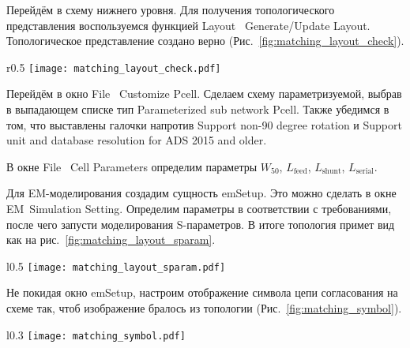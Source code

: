 Перейдём в схему нижнего уровня. Для получения топологического представления воспользуемся функцией Layout \textrightarrow\ Generate/Update Layout.
Топологическое представление создано верно (Рис.~\ref{fig:matching_layout_check}).

\begin{wrapfigure}{r}{0.5\textwidth}
    \centering
    \texttt{[image: matching\_layout\_check.pdf]}
    \caption{Проверка топологического представления}%
    \label{fig:matching_layout_check}
\end{wrapfigure}

Перейдём в окно File \textrightarrow\ Customize Pcell.
Сделаем схему параметризуемой, выбрав в выпадающем списке тип Parameterized sub network Pcell.
Также убедимся в том, что выставлены галочки напротив Support non-90 degree rotation и Support unit and database resolution for ADS 2015 and older.

В окне File \textrightarrow\ Cell Parameters определим параметры $W_{50}$, $L_\text{feed}$, $L_\text{shunt}$, $L_\text{serial}$.

Для EM-моделирования создадим сущность emSetup.
Это можно сделать в окне EM\textrightarrow\ Simulation Setting.
Определим параметры в соответствии с требованиями, после чего запусти моделирования S-параметров.
В итоге топология примет вид как на рис.~\ref{fig:matching_layout_sparam}.
\begin{wrapfigure}{l}{0.5\textwidth}
    \centering
    \texttt{[image: matching\_layout\_sparam.pdf]}
    \caption{Топологическое представление после моделирования S-параметров}%
    \label{fig:matching_layout_sparam}
\end{wrapfigure}

Не покидая окно emSetup, настроим отображение символа цепи согласования на схеме так, чтоб изображение бралось из топологии (Рис.~\ref{fig:matching_symbol}).

\begin{wrapfigure}{l}{0.3\textwidth}
    \centering
    \texttt{[image: matching\_symbol.pdf]}
    \caption{Обновлённый символ}%
    \label{fig:matching_symbol}
\end{wrapfigure}

